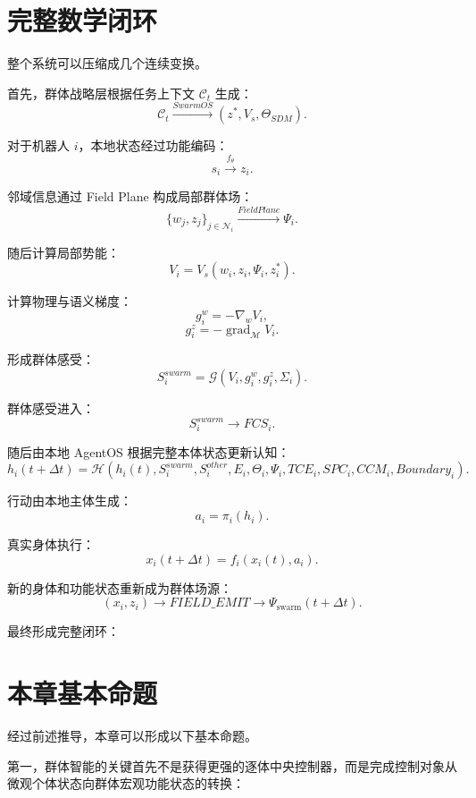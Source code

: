 \section{完整数学闭环}

整个系统可以压缩成几个连续变换。

首先，群体战略层根据任务上下文 $\mathcal C_t$ 生成：
\[
\mathcal C_t
\overset{SwarmOS}{\longrightarrow}
(
z^*,
V_s,
\Theta_{SDM}
).
\]

对于机器人 $i$，本地状态经过功能编码：
\[
s_i
\overset{f_\theta}{\longrightarrow}
z_i.
\]

邻域信息通过 Field Plane 构成局部群体场：
\[
\{
w_j,z_j
\}_{j\in\mathcal N_i}
\overset{FieldPlane}{\longrightarrow}
\Psi_i.
\]

随后计算局部势能：
\[
V_i
=
V_s(
w_i,
z_i,
\Psi_i,
z_i^*
).
\]

计算物理与语义梯度：
\[
g_i^w
=
-\nabla_wV_i,
\]
\[
g_i^z
=
-\operatorname{grad}_{\mathcal M}V_i.
\]

形成群体感受：
\[
S_i^{swarm}
=
\mathcal G(
V_i,
g_i^w,
g_i^z,
\Sigma_i
).
\]

群体感受进入：
\[
S_i^{swarm}
\rightarrow
FCS_i.
\]

随后由本地 AgentOS 根据完整本体状态更新认知：
\[
h_i(t+\Delta t)
=
\mathcal H
\left(
h_i(t),
S_i^{swarm},
S_i^{other},
E_i,
\Theta_i,
\Psi_i,
TCE_i,
SPC_i,
CCM_i,
Boundary_i
\right).
\]

行动由本地主体生成：
\[
a_i
=
\pi_i(h_i).
\]

真实身体执行：
\[
x_i(t+\Delta t)
=
f_i(
x_i(t),
a_i
).
\]

新的身体和功能状态重新成为群体场源：
\[
(x_i,z_i)
\rightarrow
FIELD\_EMIT
\rightarrow
\Psi_{\mathrm{swarm}}(t+\Delta t).
\]

最终形成完整闭环：
\begin{statementbox}
\centering
{}
\end{statementbox}


\section{本章基本命题}

经过前述推导，本章可以形成以下基本命题。

第一，群体智能的关键首先不是获得更强的逐体中央控制器，而是完成控制对象从微观个体状态向群体宏观功能状态的转换：
\begin{statementbox}
\centering
{}
\end{statementbox}

